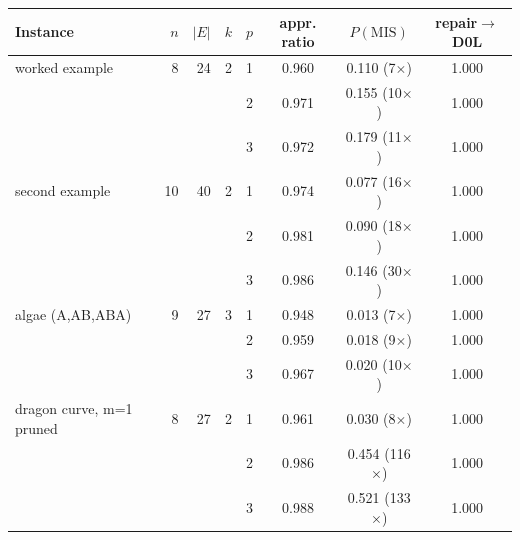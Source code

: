 \begin{tabular}{lrrrcccc}
\toprule
Instance & $n$ & $|E|$ & $k$ & $p$ & appr. ratio & $P(\mathrm{MIS})$ & repair$\to$D0L \\
\midrule
worked example & 8 & 24 & 2 & 1 & 0.960 & 0.110 (7$\times$) & 1.000 \\
 &  &  &  & 2 & 0.971 & 0.155 (10$\times$) & 1.000 \\
 &  &  &  & 3 & 0.972 & 0.179 (11$\times$) & 1.000 \\
\addlinespace
second example & 10 & 40 & 2 & 1 & 0.974 & 0.077 (16$\times$) & 1.000 \\
 &  &  &  & 2 & 0.981 & 0.090 (18$\times$) & 1.000 \\
 &  &  &  & 3 & 0.986 & 0.146 (30$\times$) & 1.000 \\
\addlinespace
algae (A,AB,ABA) & 9 & 27 & 3 & 1 & 0.948 & 0.013 (7$\times$) & 1.000 \\
 &  &  &  & 2 & 0.959 & 0.018 (9$\times$) & 1.000 \\
 &  &  &  & 3 & 0.967 & 0.020 (10$\times$) & 1.000 \\
\addlinespace
dragon curve, m=1 pruned & 8 & 27 & 2 & 1 & 0.961 & 0.030 (8$\times$) & 1.000 \\
 &  &  &  & 2 & 0.986 & 0.454 (116$\times$) & 1.000 \\
 &  &  &  & 3 & 0.988 & 0.521 (133$\times$) & 1.000 \\
\bottomrule
\end{tabular}
